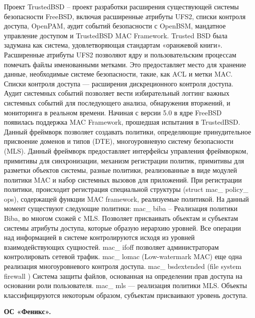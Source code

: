 Проект TrustedBSD – проект разработки расширения существующей системы 
безопасности FreeBSD, включая расширенные атрибуты UFS2, списки контроля доступа, OpenPAM, аудит событий безопасности с OpenBSM, мандатное управление доступом и TrustedBSD MAC Framework. Trusted BSD была задумана как система, удовлетворяющая стандартам «оранжевой книги». Расширенные атрибуты UFS2 позволяют ядру и пользовательским процессам помечать файлы именованными метками. Это предоставляет место для хранение данные, необходимые системе безопасности, такие, как ACL и метки MAC. Списки контроля доступа — расширения дискреционного контроля доступа. Аудит системных событий позволяет вести избирательный логгинг важных системных событий для последующего анализа, обнаружения вторжений, и мониторинга в реальном времени. Начиная с версии 5.0 в ядре FreeBSD появилась поддержка MAC Framework, прошедшая испытания в TrustedBSD. Данный фреймворк позволяет создавать политики, определяющие принудительное присвоение доменов и типов (DTE), многоуровневую систему безопасности (MLS). Данный фреймворк предоставляет интерфейсы управления фреймворком, примитивы для синхронизации, механизм регистрации политик, примитивы для разметки объектов системы, разные политики, реализованные в виде модулей политики MAC и набор системных вызовов для приложений. При регистрации политики, происходит регистрация специальной структуры (struct mac\_ policy\_ ops), содержащей функции MAC framework, реализуемые политикой. На данный момент существуют следующие политики: 
mac\_ biba – Реализация политики Biba, во многом схожей с MLS. Позволяет присваивать объектам и субъектам системы атрибуты доступа, которые образую иерархию уровней. Все операции над информацией в системе контролируются исходя из уровней взаимодействующих сущностей. 
mac\_ ifoff позволяет администраторам контролировать сетевой трафик. 
mac\_ lomac (Low-watermark MAC) еще одна реализация многоуровневого контроля доступа. 
mac\_ bsdextended (file system firewall ) Система защиты файлов, основанная на определении прав доступа на основании роли пользователя. 
mac\_ mls — реализация политики MLS. Объекты классифицируются  некоторым образом, субъектам присваивают уровень доступа. 

\bigskip
{\bfseries ОС «Феникс».}

